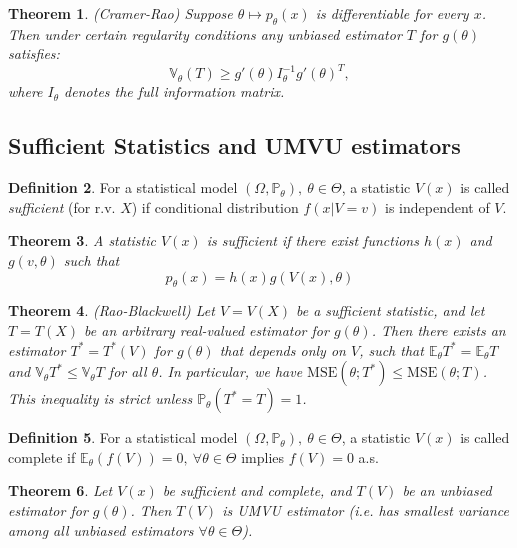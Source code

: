 \documentclass[12pt]{article}
\newtheorem{theorem}{Theorem}[section]
\theoremstyle{definition}
\newtheorem{definition}[theorem]{Definition}
\theoremstyle{remark}
\numberwithin{equation}{section}
\newcommand{\PP}{\mathbb{P}}
\newcommand{\EE}{\mathbb{E}}
\newcommand{\VV}{\mathbb{V}}
\begin{document}
\begin{theorem}\label{cramerraobound}\emph{(Cramer-Rao)}
	Suppose $\theta\mapsto p_\theta(x)$ is differentiable for every $x$. Then under certain regularity conditions any unbiased estimator $T$ for $g(\theta)$ satisfies:
	\begin{equation*}
		\VV_\theta(T) \geq g'(\theta)I_\theta^{-1}g'(\theta)^T,
	\end{equation*}
	where $I_\theta$ denotes the \emph{full} information matrix.
\end{theorem}


\subsection{Sufficient Statistics and UMVU estimators}

\begin{definition}
	For a statistical model $(\Omega, \PP_\theta), \ \theta \in \Theta$, a statistic $V(x)$ is called \emph{sufficient} (for r.v. $X$) if conditional distribution $f(x|V = v)$ is independent of $V$.
\end{definition}

\begin{theorem}\label{factorizarion}
	A statistic $V(x)$ is sufficient if there exist functions $h(x)$ and $g(v, \theta)$ such that
	$$
	p_\theta(x) = h(x)g(V(x), \theta)
	$$
\end{theorem}

\begin{theorem}\emph{(Rao-Blackwell)}
	Let $V = V(X)$ be a sufficient statistic, and let $T = T(X)$ be an arbitrary real-valued estimator for $g(\theta)$. Then there exists an estimator $T^* = T^*(V)$ for $g(\theta)$ that depends only on $V$, such that $\EE_\theta T^* = \EE_\theta T$ and $\VV_\theta T^* \leq \VV_\theta T$ for all $\theta$. In particular, we have $\text{MSE}(\theta; T^*) \leq \text{MSE}(\theta; T)$. This inequality is strict unless $\PP_\theta(T^* = T) = 1$.
\end{theorem}

\begin{definition}
For a statistical model $(\Omega, \PP_\theta), \ \theta \in \Theta$, a statistic $V(x)$	is called complete if $\EE_\theta(f(V)) = 0,\ \forall \theta\in \Theta$ implies $f(V)=0$ a.s.
\end{definition}

\begin{theorem}
	Let $V(x)$ be sufficient and complete, and $T(V)$ be an unbiased estimator for $g(\theta)$. Then $T(V)$ is UMVU estimator (i.e. has smallest variance among all unbiased estimators $\forall\theta\in\Theta$).
\end{theorem}
\end{document}
